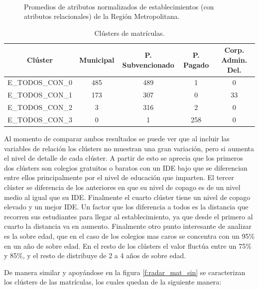 \begin{figure}[H]
 \caption{Promedios de atributos normalizados de establecimientos (con atributos relacionales) de la Región Metropolitana.}\
 \label{f:radar_estab_con}
\end{figure}

\begin{table}[H]
\centering
\caption{Clústers de matrículas.}
\label{tab:cl_dependencia_con}
\begin{tabular}{|c|c|c|c|c|}
\hline
\textbf{Clúster} & \textbf{Municipal} & \textbf{P. Subvencionado} & \textbf{P. Pagado} & \textbf{Corp. Admin. Del.}   \\ \hline
E\_TODOS\_CON\_0 & 485 & 489 & 1 & 0 \\ \hlinea
E\_TODOS\_CON\_1 & 173 & 307 & 0 & 33 \\ \hline
E\_TODOS\_CON\_2 & 3 & 316 & 2 & 0 \\ \hline
E\_TODOS\_CON\_3 & 0 & 1 & 258 & 0 \\ \hline
\end{tabular}
\end{table}

Al momento de comparar ambos resultados se puede ver que al incluir las variables de relación los clústers no muestran una gran variación, pero si aumenta el nivel de detalle de cada clúster. A partir de esto se aprecia que los primeros dos clústers son colegios gratuitos o baratos con un IDE bajo que se diferencian entre ellos principalmente por el nivel de educación que imparten. El tercer clúster se diferencia de los anteriores en que su nivel de copago es de un nivel medio al igual que su IDE. Finalmente el cuarto clúster tiene un nivel de copago elevado y un mejor IDE. Un factor que los diferencia a todos es la distancia que recorren sus estudiantes para llegar al establecimiento, ya que desde el primero al cuarto la distancia va en aumento. Finalmente otro punto interesante de analizar es la sobre edad, que en el caso de los colegios mas caros se concentra con un 95\% en un año de sobre edad. En el resto de los clústers el valor fluctúa entre un 75\% y 85\%, y el resto de distribuye de 2 a 4 años de sobre edad.

De manera similar y apoyándose en la figura \ref{f:radar_mat_sin} se caracterizan los clústers de las matrículas, los cuales quedan de la siguiente manera:

